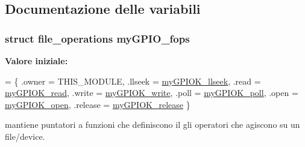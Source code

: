 \subsection{Documentazione delle variabili}
\hypertarget{group___kernel-_module_ga9f31111fdb3b4a5944e18d45045e0f01}{
\subsubsection[{my\+G\+P\+I\+O\+\_\+fops}]{\setlength{\rightskip}{0pt plus 5cm}struct file\+\_\+operations my\+G\+P\+I\+O\+\_\+fops\hspace{0.3cm}{\ttfamily [static]}}}\label{group___kernel-_module_ga9f31111fdb3b4a5944e18d45045e0f01}
{\bfseries Valore iniziale\+:}
\begin{DoxyCode}
= \{
        .owner      = THIS\_MODULE,
        .llseek     = \hyperlink{group___kernel-_module_ga66e7f726b72320a272b633ecbaecefff}{myGPIOK\_llseek},
        .read       = \hyperlink{group___kernel-_module_ga90ac339df9c02ae5f11a2a7727adc923}{myGPIOK\_read},
        .write      = \hyperlink{group___kernel-_module_ga1eea0f6c86e8966ba9b701da57502aad}{myGPIOK\_write},
        .poll       = \hyperlink{group___kernel-_module_gaba935e8a8215c2ebce9a7147fd4f5147}{myGPIOK\_poll},
        .open       = \hyperlink{group___kernel-_module_gad013759c18fbf6ea96005b9b3bfa5b4e}{myGPIOK\_open},
        .release    = \hyperlink{group___kernel-_module_ga17ce7f574723246c790b70b06e3e7103}{myGPIOK\_release}
\}
\end{DoxyCode}


mantiene puntatori a funzioni che definiscono il gli operatori che agiscono su un file/device. 

